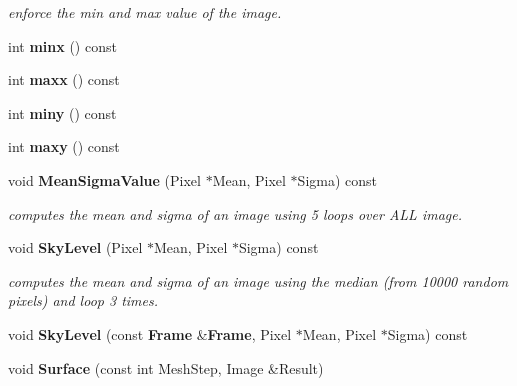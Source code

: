 \begin{CompactItemize}
\begin{CompactList}\small\item\em enforce the min and max value of the image.\item\end{CompactList}\item 
{}
int {\bf minx} () const\label{class_image_a13}

\item 
{}
int {\bf maxx} () const\label{class_image_a14}

\item 
{}
int {\bf miny} () const\label{class_image_a15}

\item 
{}
int {\bf maxy} () const\label{class_image_a16}

\item 
{}
void {\bf Mean\-Sigma\-Value} (Pixel $\ast$Mean, Pixel $\ast$Sigma) const\label{class_image_a17}

\begin{CompactList}\small\item\em computes the mean and sigma of an image using 5 loops over ALL image.\item\end{CompactList}\item 
{}
void {\bf Sky\-Level} (Pixel $\ast$Mean, Pixel $\ast$Sigma) const\label{class_image_a18}

\begin{CompactList}\small\item\em computes the mean and sigma of an image using the median (from 10000 random pixels) and loop 3 times.\item\end{CompactList}\item 
{}
void {\bf Sky\-Level} (const {\bf Frame} \&{\bf Frame}, Pixel $\ast$Mean, Pixel $\ast$Sigma) const\label{class_image_a19}

\item 
{}
void {\bf Surface} (const int Mesh\-Step, Image \&Result)\label{class_image_a20}


\end{CompactItemize}
